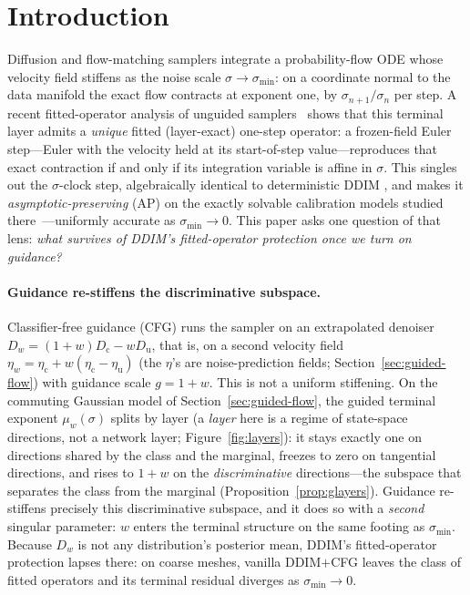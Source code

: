 \documentclass{article} %
\theoremstyle{plain}
\theoremstyle{definition}
\theoremstyle{remark}
\providecommand{\smin}{\sigma_{\min}}
\providecommand{\Dc}{D_{\mathrm{c}}}
\providecommand{\Du}{D_{\mathrm{u}}}
\providecommand{\Dw}{D_{w}}
\providecommand{\etac}{\eta_{\mathrm{c}}}
\providecommand{\etau}{\eta_{\mathrm{u}}}
\providecommand{\etaw}{\eta_{w}}
\begin{document}
\section{Introduction}
\label{sec:intro}

Diffusion and flow-matching samplers integrate a probability-flow ODE whose
velocity field stiffens as the noise scale $\sigma\to\smin$: on a coordinate
normal to the data manifold the exact flow contracts at exponent one, by
$\sigma_{n+1}/\sigma_n$ per step. A recent fitted-operator analysis of
unguided samplers~\citep{ap2026} shows that this terminal
layer admits a \emph{unique} fitted (layer-exact) one-step operator: a
frozen-field Euler step---Euler with the velocity held at its start-of-step
value---reproduces that exact contraction if and only if its integration
variable is affine in $\sigma$. This singles out the $\sigma$-clock step,
algebraically identical to deterministic DDIM \citep{song2021ddim}, and makes
it \emph{asymptotic-preserving} (AP) on the exactly solvable calibration
models studied there~\citep{ap2026}---uniformly accurate as $\smin\to0$. This paper asks
one question of that lens: \emph{what survives of DDIM's fitted-operator
protection once we turn on guidance?}

\paragraph{Guidance re-stiffens the discriminative subspace.}
Classifier-free guidance (CFG) \citep{hosalimans2022cfg} runs the sampler on an
extrapolated denoiser $\Dw=(1+w)\Dc-w\Du$, that is, on a second velocity field
$\etaw=\etac+w(\etac-\etau)$ (the $\eta$'s are noise-prediction fields;
Section~\ref{sec:guided-flow}) with guidance scale $g=1+w$. This is not a uniform
stiffening. On the commuting Gaussian model of
Section~\ref{sec:guided-flow}, the guided terminal exponent
$\mu_w(\sigma)$ splits by layer (a \emph{layer} here is a regime of
state-space directions, not a network layer; Figure~\ref{fig:layers}): it
stays exactly one
on directions shared by the class and the marginal, freezes to zero on
tangential directions, and rises to $1+w$ on the \emph{discriminative}
directions---the subspace that separates the class from the marginal
(Proposition~\ref{prop:glayers}). Guidance re-stiffens precisely this
discriminative subspace, and it does so with a \emph{second} singular
parameter: $w$ enters the terminal structure on the same footing as $\smin$.
Because $\Dw$ is not any distribution's posterior mean, DDIM's fitted-operator
protection lapses there: on coarse meshes, vanilla DDIM$+$CFG leaves the
class of fitted operators and its terminal residual diverges as $\smin\to0$.
\end{document}
